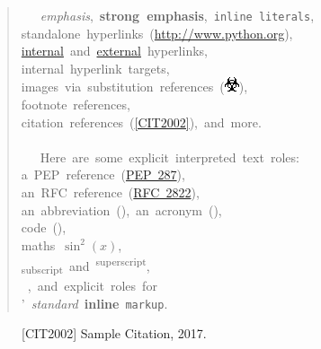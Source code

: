 \documentclass[a4paper]{article}
\begin{document}
\begin{quote}
\ttfamily\raggedright
~~~\emph{emphasis},~\textbf{strong~emphasis},~\texttt{inline~literals},\\
standalone~hyperlinks~(\url{http://www.python.org}),\\
\hyperref[internal]{internal}~and~\href{http://www.python.org/}{external}~hyperlinks,\\
%
\label{internal}internal~hyperlink~targets,\\
images~via~substitution~references~(\includegraphics{../../../docs/user/rst/images/biohazard.png}),\\
footnote~references,\\
citation~references~(\hyperlink{cit2002}{[CIT2002]}),~and~more.\\
~\\
~~~Here~are~some~explicit~interpreted~text~roles:\\
a~PEP~reference~(\href{http://www.python.org/dev/peps/pep-0287}{PEP~287}),\\
an~RFC~reference~(\href{http://tools.ietf.org/html/rfc2822.html}{RFC~2822}),\\
an~abbreviation~(),~an~acronym~(),\\
code~(\texttt{}),\\
maths~$\sin^2(x)$,\\
\textsubscript{subscript}~and~\textsuperscript{superscript},\\
~,~and~explicit~roles~for\\
'~\emph{standard}~\textbf{inline}~\texttt{markup}.
\end{quote}
%
\begin{figure}[b][CIT2002]
Sample Citation, 2017.
\end{figure}
\end{document}
